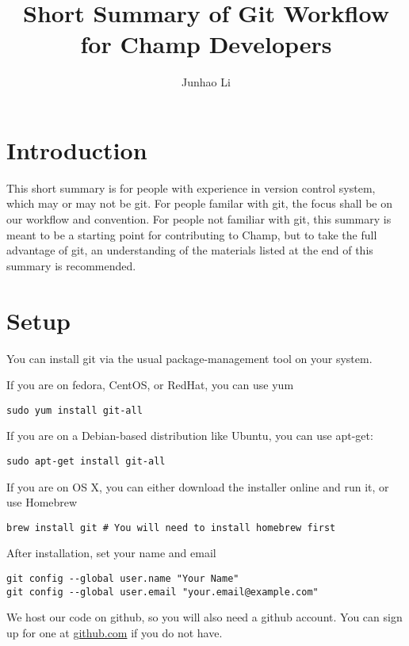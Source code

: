 \documentclass[runningheads,letterpaper]{llncs}
\begin{document}
\mainmatter
\title{Short Summary of Git Workflow for Champ Developers}

\author{Junhao Li}

\maketitle

\section*{Introduction}

This short summary is for people with experience in version control system, which may or may not be git.
For people familar with git, the focus shall be on our workflow and convention.
For people not familiar with git, this summary is meant to be a starting point for contributing to Champ, but to take the full advantage of git, an understanding of the materials listed at the end of this summary is recommended.

\section{Setup}

You can install git via the usual package-management tool on your system.

If you are on fedora, CentOS, or RedHat, you can use yum
\begin{verbatim}
sudo yum install git-all
\end{verbatim}
If you are on a Debian-based distribution like Ubuntu, you can use apt-get:
\begin{verbatim}
sudo apt-get install git-all
\end{verbatim}
If you are on OS X, you can either download the installer online and run it, or use Homebrew
\begin{verbatim}
brew install git # You will need to install homebrew first
\end{verbatim}

After installation, set your name and email
\begin{verbatim}
git config --global user.name "Your Name"
git config --global user.email "your.email@example.com"
\end{verbatim}

We host our code on github, so you will also need a github account.
You can sign up for one at \url{github.com} if you do not have.
\end{document}
